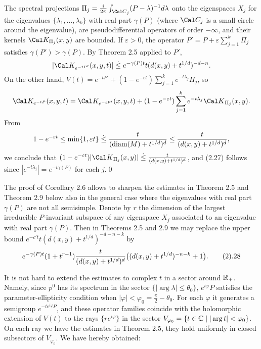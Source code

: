 The spectral projections $\Pi_{j} = \frac{i}{2\pi}\int_{{\Cal C}_j}
(P-\lambda)^{-1} d\lambda$ onto the eigenspaces $X_{j}$ for the
eigenvalues
$\{\lambda _1,\dots,\lambda _k\}$ with real part
$\gamma(P)$ (where $\Cal C_j$ is a small circle around the eigenvalue),
are pseudodifferential operators of order $-\infty$, and their kernels
$\Cal
K_{\Pi _{j}}(x,y)$ are
bounded. If $\varepsilon>0$, the operator $P' = P + \varepsilon
\sum_{j=1}^k\Pi_{j}$ satisfies $\gamma(P')>\gamma(P)$. By
Theorem 2.5 applied to $P'$,
$$
|\Cal K_{e^{-tP'}}(x,y,t)|\leg e^{-\gamma(P)t} t (d(x,y)+t^{1/d})^{-d-n} .
$$
On the other hand, $V(t)=e^{-tP'}+(1- e^{-\varepsilon
t})\sum_{j=1}^ke^{-t\lambda _j}\Pi_{j }$, so
$$
\Cal K_{e^{-tP}}(x,y,t)=\Cal
K_{e^{-tP'}}(x,y,t) +(1- e^{-\varepsilon t})\sum_{j=1}^ke^{-t\lambda _j}
{\Cal K}_{\Pi_{j}}(x,y).
$$
From
$$
1-e^{-\varepsilon t}\leq \min\{1, \varepsilon t\} \;\dot{\le}\;
\frac{t}{(\operatorname{diam}(M) +t^{1/d})^d} \leq \frac{t}{(d(x,y)
+t^{1/d})^d} ,
$$
we conclude that $(1- e^{-\varepsilon t})|{\Cal K}_{\Pi_j}(x,y)|\leg
\frac{t}{(d(x,y) +t^{1/d})^d}$, and (2.27) follows since
$|e^{-t\lambda _j}|=e^{-t\gamma (P)}$ for each $j$.\qed
\enddemo


The proof of Corollary 2.6 allows to sharpen the estimates in Theorem
2.5 and Theorem 2.9 below
also in the general case where the eigenvalues with real part
$\gamma(P)$ are not all semisimple.
Denote by $r$ the dimension of the largest irreducible $P$-invariant
subspace of any eigenspace $X_{j}$ associated to an eigenvalue with real
part $\gamma(P)$. Then in Theorems 2.5 and 2.9 we may replace the upper bound
$e^{-c't} t (d(x,y)+t^{1/d})^{-d-n-k}$ by
$$e^{-\gamma(P)t}
(1+t^{r-1})\frac{t}{(d(x,y)+t^{1/d})^d}\bigl(
(d(x,y)+t^{1/d})^{-n-k}+1\bigr).\tag2.28
$$
\endexample



It is not hard to extend the estimates to complex $t$ in a sector
around $\Bbb R_+$. Namely, since $p^0$ has its spectrum in the sector
$\{|\arg \lambda |\le \theta _0\}$,
$e^{i\varphi }P$ satisfies the parameter-ellipticity condition when $|\varphi |<\varphi _0=\frac\pi 2-\theta _0$.
For each $\varphi $ it generates a semigroup $e^{-te^{i\varphi }P}$,
and these operator families coincide with the holomorphic extension of
$V(t)$ to the rays $\{re^{i\varphi }\}$ in the sector  $V_{\varphi _0}=\{t\in{\Bbb C}\mid
|\operatorname{arg}t|<\varphi _0\}$. On each ray we have the estimates
in Theorem 2.5, they hold uniformly in closed subsectors of $V_{\varphi
_0}
$. We have hereby obtained:


